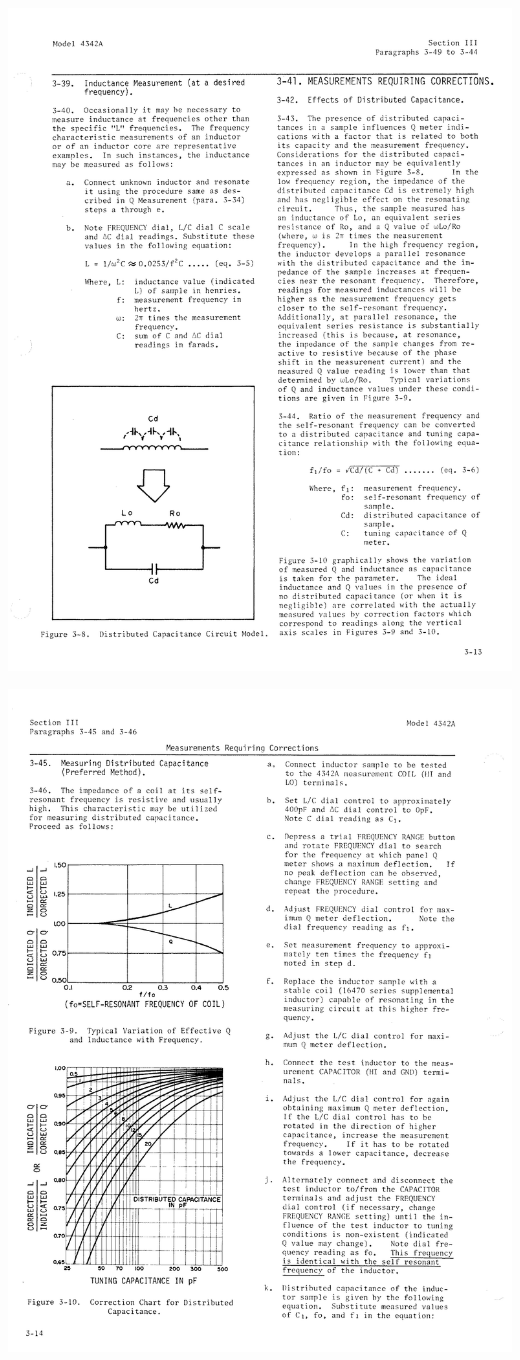 \documentclass[titlepage, letterpaper, 11pt]{article}
\begin{document}
\includegraphics[width=1\textwidth]{qMeter/page35}

\includegraphics[width=1\textwidth]{qMeter/page36}
\end{document}
